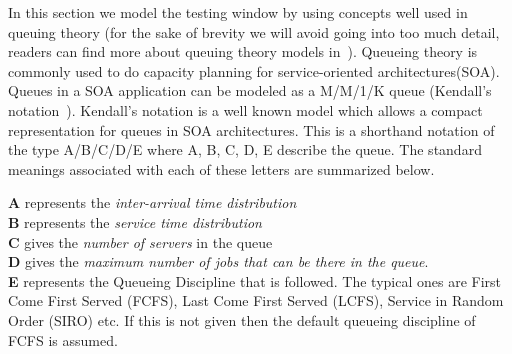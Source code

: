 In this section we model the testing window by using concepts well used in queuing theory (for the sake of brevity we will avoid going into too much detail, readers can find more about queuing theory models in~\cite{queueBook}).
Queueing theory is commonly used to do capacity planning for service-oriented architectures(SOA).
Queues in a SOA application can be modeled as a M/M/1/K queue (Kendall's notation~\cite{kendall}).
Kendall's notation is a well known model which allows a compact representation for queues in SOA architectures.
This is a shorthand notation of the type A/B/C/D/E where A, B, C, D, E describe the queue.
The standard meanings associated with each of these letters are summarized below.\\

\begin{framed}
	\noindent \textbf{A} represents the \emph{inter-arrival time distribution}\\
	\textbf{B} represents the \emph{service time distribution}\\
	\textbf{C} gives the \emph{number of servers} in the queue\\
	\textbf{D} gives the \emph{maximum number of jobs that can be there in the queue}.\\
	\textbf{E} represents the Queueing Discipline that is followed. The typical ones are First Come First Served (FCFS), Last Come First Served (LCFS), Service in Random Order (SIRO) etc. If this is not given then the default queueing discipline of FCFS is assumed.
\end{framed}

